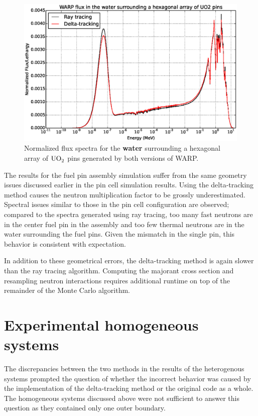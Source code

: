 \begin{figure}[h!]
\includegraphics[width=\textwidth]{img/assembly-water.eps}
\caption{Normalized flux spectra for the \textbf{water} surrounding a hexagonal array of 
$\ce{UO_2}$ pins generated by both versions of WARP. \label{assembly-water}}
\end{figure}

The results for the fuel pin assembly simulation suffer from the same geometry issues discussed earlier
in the pin cell simulation results. Using the delta-tracking method causes the neutron multiplication
factor to be grossly underestimated. Spectral issues similar to those in the pin cell configuration are
observed; compared to the spectra generated using ray tracing, too many fast neutrons are in the center 
fuel pin in the assembly and too few thermal neutrons are in the water surrounding the fuel pins.
Given the mismatch in the single pin, this behavior is consistent with expectation.

In addition to these geometrical errors, the delta-tracking method is again slower than the ray tracing
algorithm. Computing the majorant cross section and resampling neutron interactions requires additional
runtime on top of the remainder of the Monte Carlo algorithm.

\section{Experimental homogeneous systems}
\label{sec:exp}

The discrepancies between the two methods in the results of the heterogenous systems prompted the
question of whether the incorrect behavior was caused by the implementation of the delta-tracking method 
or the original code as a whole. The homogeneous systems discussed above were not sufficient to answer 
this question as they contained only one outer boundary.

